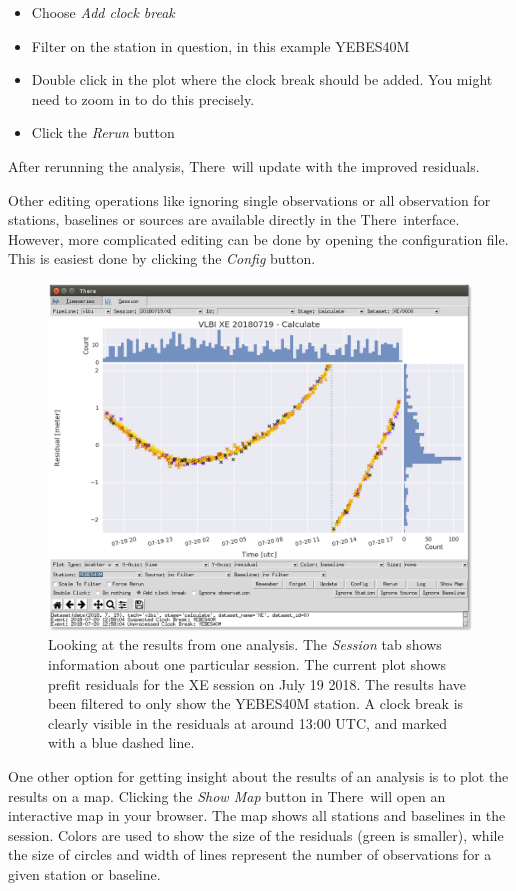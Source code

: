 \documentclass[twocolumn,twoside]{svmultivs_gm} %
\newcommand{\there}{\textsf{There}}
\begin{document}
\begin{itemize}
\item Choose \emph{Add clock break}
\item Filter on the station in question, in this example YEBES40M
\item Double click in the plot where the clock break should be added. You might need to zoom in to do this precisely.
\item Click the \emph{Rerun} button
\end{itemize}

After rerunning the analysis, \there\ will update with the improved residuals.

Other editing operations like ignoring single observations or all observation for stations, baselines or sources are available directly in the \there\ interface. However, more complicated editing can be done by opening the configuration file. This is easiest done by clicking the \emph{Config} button.

\begin{figure}[t]
  \includegraphics[width=.5\textwidth]{hjelle04.png}
  \caption{Looking at the results from one analysis. The \emph{Session} tab shows information about one particular session. The current plot shows prefit residuals for the XE session on July 19 2018. The results have been filtered to only show the YEBES40M station. A clock break is clearly visible in the residuals at around 13:00 UTC, and marked with a blue dashed line.}
  \label{fig:there_session}
\end{figure}

One other option for getting insight about the results of an analysis is to plot the results on a map. Clicking the \emph{Show Map} button in \there\ will open an interactive map in your browser. The map shows all stations and baselines in the session. Colors are used to show the size of the residuals (green is smaller), while the size of circles and width of lines represent the number of observations for a given station or baseline.
\end{document}
